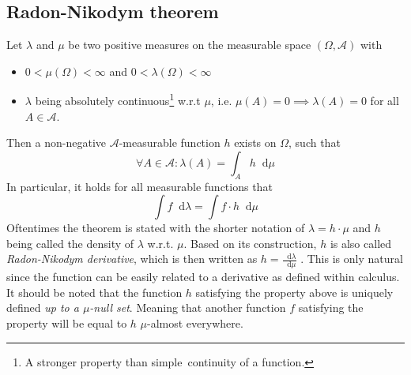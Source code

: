 \documentclass[12pt]{article}
\newcommand*\diff{\mathop{}\!\mathrm{d}}
\begin{document}
\subsection{Radon-Nikodym theorem}
Let $\lambda$ and $\mu$ be two positive measures on the measurable space $(\Omega , \mathscr{A})$ with
\begin{itemize}
\item $0 < \mu (\Omega ) < \infty$ and $0 < \lambda (\Omega ) < \infty$
\item $\lambda$ being absolutely continuous\footnote{A stronger property than \glqq simple\grqq \ continuity of a function.} w.r.t $\mu$, i.e. $\mu (A) = 0 \implies \lambda (A) = 0$ for all $A \in \mathscr{A}$.
\end{itemize}
Then a non-negative $\mathscr{A}$-measurable function $h$ exists on $\Omega$, such that
\[
\forall A \in \mathscr{A} : \lambda (A) = \int_A h \diff \mu
\]
In particular, it holds for all measurable functions that
\[
\int f \diff \lambda = \int f \cdot h \diff \mu
\]
Oftentimes the theorem is stated with the shorter notation of $\lambda = h \cdot \mu$ and $h$ being called the density of $\lambda$ w.r.t. $\mu$. Based on its construction, $h$ is also called \textit{Radon-Nikodym derivative}, which is then written as $h = \frac{\diff \lambda}{\diff \mu}$ . This is only natural since the function can be easily related to a derivative as defined within calculus. \\
It should be noted that the function $h$ satisfying the property above is uniquely defined \textit{up to a $\mu$-null set}. Meaning that another function $f$ satisfying the property will be equal to $h$ $\mu$-almost everywhere.
\end{document}
